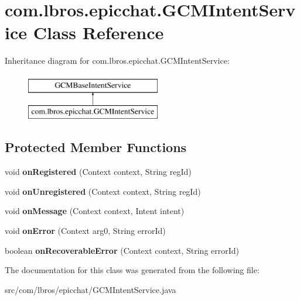 \hypertarget{classcom_1_1lbros_1_1epicchat_1_1_g_c_m_intent_service}{\section{com.\-lbros.\-epicchat.\-G\-C\-M\-Intent\-Service Class Reference}
\label{classcom_1_1lbros_1_1epicchat_1_1_g_c_m_intent_service}
}
Inheritance diagram for com.\-lbros.\-epicchat.\-G\-C\-M\-Intent\-Service\-:\begin{figure}[H]
\begin{center}
\leavevmode
\includegraphics[height=2.000000cm]{classcom_1_1lbros_1_1epicchat_1_1_g_c_m_intent_service}
\end{center}
\end{figure}
\subsection*{Protected Member Functions}
\begin{DoxyCompactItemize}
\item 
\hypertarget{classcom_1_1lbros_1_1epicchat_1_1_g_c_m_intent_service_a7c47a68afddccb0f2edb3e192a617736}{void {\bfseries on\-Registered} (Context context, String reg\-Id)}\label{classcom_1_1lbros_1_1epicchat_1_1_g_c_m_intent_service_a7c47a68afddccb0f2edb3e192a617736}

\item 
\hypertarget{classcom_1_1lbros_1_1epicchat_1_1_g_c_m_intent_service_a85969368de7f41e5f0656619cc714a3c}{void {\bfseries on\-Unregistered} (Context context, String reg\-Id)}\label{classcom_1_1lbros_1_1epicchat_1_1_g_c_m_intent_service_a85969368de7f41e5f0656619cc714a3c}

\item 
\hypertarget{classcom_1_1lbros_1_1epicchat_1_1_g_c_m_intent_service_a45f7a09b10d4fa5cb5af33ee002220ca}{void {\bfseries on\-Message} (Context context, Intent intent)}\label{classcom_1_1lbros_1_1epicchat_1_1_g_c_m_intent_service_a45f7a09b10d4fa5cb5af33ee002220ca}

\item 
\hypertarget{classcom_1_1lbros_1_1epicchat_1_1_g_c_m_intent_service_a1148c577db8ce047d0fa266e5120b842}{void {\bfseries on\-Error} (Context arg0, String error\-Id)}\label{classcom_1_1lbros_1_1epicchat_1_1_g_c_m_intent_service_a1148c577db8ce047d0fa266e5120b842}

\item 
\hypertarget{classcom_1_1lbros_1_1epicchat_1_1_g_c_m_intent_service_aba9f0cbc270b58bd36067e459ff6dc6d}{boolean {\bfseries on\-Recoverable\-Error} (Context context, String error\-Id)}\label{classcom_1_1lbros_1_1epicchat_1_1_g_c_m_intent_service_aba9f0cbc270b58bd36067e459ff6dc6d}

\end{DoxyCompactItemize}


The documentation for this class was generated from the following file\-:\begin{DoxyCompactItemize}
\item 
src/com/lbros/epicchat/G\-C\-M\-Intent\-Service.\-java\end{DoxyCompactItemize}
